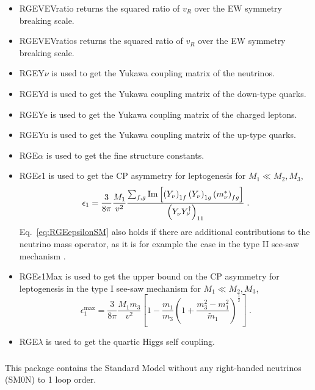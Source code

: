 \documentclass[10pt,a4paper,twoside]{scrartcl}
\begin{document}
\begin{itemize}
\item 
RGEVEVratio returns the squared ratio of $v_R$ over the EW symmetry breaking scale.
\item 
RGEVEVratios returns the squared ratio of $v_R$ over the EW symmetry breaking scale.
\item 
RGEY$\nu$ is used to get the Yukawa coupling matrix of the neutrinos.
\item 
RGEYd is used to get the Yukawa coupling matrix of the down-type quarks.
\item 
 RGEYe is used to get the Yukawa coupling matrix of the charged leptons.
\item 
RGEYu is used to get the Yukawa coupling matrix of the up-type quarks.
\item 
RGE$\alpha$ is used to get the fine structure constants.
\item 
RGE$\epsilon$1 is used to get the CP asymmetry \cite{Covi:1996wh} for 
leptogenesis for $M_1 \ll M_2, M_3$,
   \begin{equation}
     \epsilon_1=\frac{3}{8\pi}\frac{M_1}{v^2}
     \frac{\sum_{f,g}\operatorname{Im}\left[\left(Y_\nu\right)_{1f}\left(Y_\nu\right)_{1g}
     \left(m^*_\nu\right)_{fg}\right]}{\left(Y_\nu Y_\nu^\dagger\right)_{11}}\; .\label{eq:RGEepsilonSM}
   \end{equation}
   Eq.~\eqref{eq:RGEepsilonSM} 
also holds if there are additional contributions to the neutrino mass operator, as it is for example 
the case in the type II see-saw mechanism \cite{Antusch:2004xy}.
\item 
RGE$\epsilon$1Max is used to get the upper bound \cite{Buchmuller:2003gz} 
on the CP asymmetry for leptogenesis in the type I see-saw mechanism 
for $M_1 \ll M_2, M_3$,
  \begin{equation}
    \epsilon_1^\text{max}=\frac{3}{8\pi}\frac{M_1 m_3}{v^2}\left[1-\frac{m_1}{m_3}\left(1+\frac{m_3^2-m_1^2}{\widetilde{m}_1}\right)^\frac{1}{2}\right]\;.
  \end{equation}
\item 
RGE$\lambda$ is used to get the quartic Higgs self coupling.

\end{itemize}

\subsubsection[\package{RGESM0N}]{}
This package contains the Standard Model without any right-handed neutrinos
(SM0N) to 1 loop order.
\end{document}
